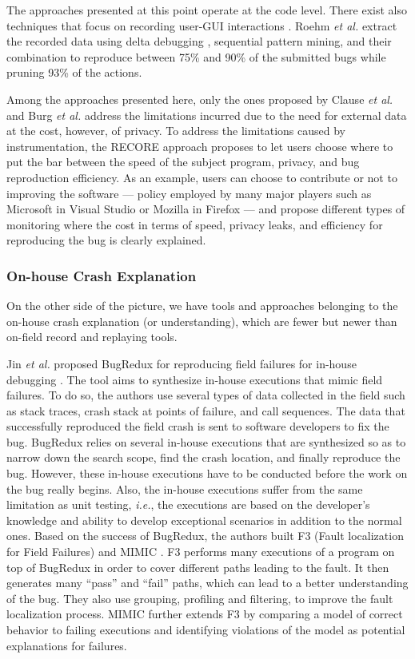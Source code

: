 The approaches presented at this point operate at the code level.
There exist also techniques that focus on recording user-GUI interactions \cite{Herbold2011,Roehm2015}.
Roehm {\it et al.} extract the recorded data using delta debugging \cite{Zeller2002}, sequential pattern mining, and their combination to reproduce between 75\% and 90\% of the submitted bugs while pruning 93\% of the actions.

Among the approaches presented here, only the ones proposed by Clause {\it et al.} and Burg {\it et al.} address the limitations incurred due to the need for external data  at the cost, however, of privacy.
To address the limitations caused by instrumentation,  the RECORE approach proposes to let users choose where to put the bar between the speed of the subject program, privacy, and bug reproduction efficiency.
As an example, users can choose to contribute or not to improving the software --- policy employed by many major players such as Microsoft in Visual Studio or Mozilla in Firefox --- and propose different types of monitoring where the cost in terms of speed, privacy leaks, and efficiency for reproducing the bug is clearly explained.

\subsubsection{On-house Crash Explanation}

On the other side of the picture, we have tools and approaches belonging to the on-house crash explanation  (or understanding), which are fewer but newer than on-field record and replaying tools.

Jin {\it et al.} proposed BugRedux for reproducing field failures for in-house debugging \cite{Jin2012}.
The tool aims to synthesize in-house executions that mimic field failures.
To do so, the authors use several types of data collected in the field such as stack traces, crash stack at points of failure, and call sequences.
The data that successfully reproduced the field crash is sent to software developers to fix the bug.
BugRedux relies on several in-house executions that are synthesized so as to narrow down the search scope,  find the crash location, and finally reproduce the bug.
However, these in-house executions have to be conducted before the work on the bug really begins.
Also, the in-house executions suffer from the same limitation as unit testing, {\it i.e.}, the executions are based on the developer's knowledge and ability to develop exceptional scenarios in addition to the normal ones.
Based on the success of BugRedux, the authors built F3 (Fault
localization for Field Failures) \cite{Jin2013} and MIMIC \cite{Zuddas2014}.
F3 performs many executions of a program on top of BugRedux in order to cover different paths leading to the fault.
It then generates many ``pass'' and ``fail'' paths, which can lead to a better understanding of the bug.
They also use grouping, profiling and filtering, to improve the fault localization process.
MIMIC further extends F3 by comparing a model of correct behavior to failing executions and identifying violations of the model as potential explanations for failures.

